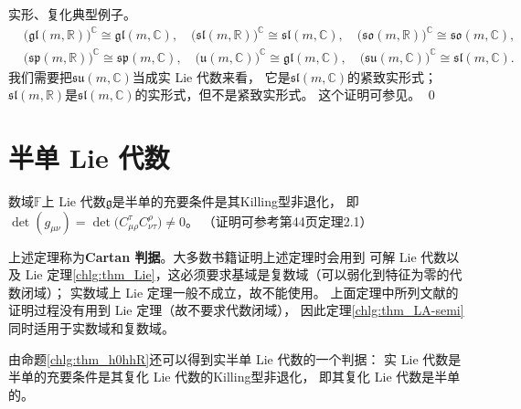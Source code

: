 \begin{example}\label{chlg:exam_real-complex}
    实形、复化典型例子。
    \begin{align*}
        &\bigl(\mathfrak{gl}(m,\mathbb{R}) \bigr)^{\mathbb{C}} \cong \mathfrak{gl}(m,\mathbb{C}), \quad
        \bigl(\mathfrak{sl}(m,\mathbb{R}) \bigr)^{\mathbb{C}} \cong \mathfrak{sl}(m,\mathbb{C}), \quad
        \bigl(\mathfrak{so}(m,\mathbb{R}) \bigr)^{\mathbb{C}} \cong \mathfrak{so}(m,\mathbb{C}), \\
        &\bigl(\mathfrak{sp}(m,\mathbb{R}) \bigr)^{\mathbb{C}} \cong \mathfrak{sp}(m,\mathbb{C}), \quad
        \bigl(\mathfrak{u}(m,\mathbb{C}) \bigr)^{\mathbb{C}} \cong \mathfrak{gl}(m,\mathbb{C}), \quad
        \bigl(\mathfrak{su}(m,\mathbb{C}) \bigr)^{\mathbb{C}} \cong \mathfrak{sl}(m,\mathbb{C}).
    \end{align*}
    我们需要把$\mathfrak{su}(m,\mathbb{C})$当成实 Lie 代数来看，
    它是$\mathfrak{sl}(m,\mathbb{C})$的紧致实形式；
    $\mathfrak{sl}(m,\mathbb{R})$是$\mathfrak{sl}(m,\mathbb{C})$的实形式，但不是紧致实形式。
    这个证明可参见\parencite[p.266]{wanzx-2013}。 \qed
\end{example}




\section{半单 Lie 代数}





\begin{theorem}\label{chlg:thm_LA-semi}
    数域$\mathbb{F}$上 Lie 代数$\mathfrak{g}$是半单的充要条件是其Killing型非退化，
    即$\det(g_{\mu\nu}) =\det\bigl( C^\tau_{\mu\rho} C^\rho_{\nu\tau}\bigr) \neq 0$。
    （证明可参考\parencite[\S 6.2]{serre-1992}第44页定理2.1）
\end{theorem}


上述定理称为\textbf{\bfseries Cartan 判据}。大多数书籍证明上述定理时会用到
可解 Lie 代数以及 Lie 定理\ref{chlg:thm_Lie}，这必须要求基域是复数域（可以弱化到特征为零的代数闭域）；
实数域上 Lie 定理一般不成立，故不能使用。
上面定理中所列文献的证明过程没有用到 Lie 定理（故不要求代数闭域），
因此定理\ref{chlg:thm_LA-semi}同时适用于实数域和复数域。

由命题\ref{chlg:thm_h0hhR}还可以得到实半单 Lie 代数的一个判据：
实 Lie 代数是半单的充要条件是其复化 Lie 代数的Killing型非退化，
即其复化 Lie 代数是半单的。


